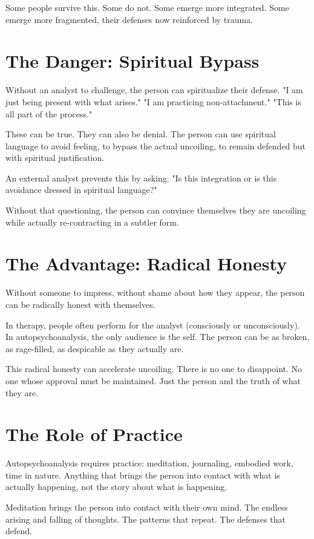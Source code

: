 \documentclass[12pt]{article}
\begin{document}
Some people survive this. Some do not. Some emerge more integrated. Some emerge more fragmented, their defenses now reinforced by trauma.

\section{The Danger: Spiritual Bypass}

Without an analyst to challenge, the person can spiritualize their defense. "I am just being present with what arises." "I am practicing non-attachment." "This is all part of the process."

These can be true. They can also be denial. The person can use spiritual language to avoid feeling, to bypass the actual uncoiling, to remain defended but with spiritual justification.

An external analyst prevents this by asking: "Is this integration or is this avoidance dressed in spiritual language?"

Without that questioning, the person can convince themselves they are uncoiling while actually re-contracting in a subtler form.

\section{The Advantage: Radical Honesty}

Without someone to impress, without shame about how they appear, the person can be radically honest with themselves.

In therapy, people often perform for the analyst (consciously or unconsciously). In autopsychoanalysis, the only audience is the self. The person can be as broken, as rage-filled, as despicable as they actually are.

This radical honesty can accelerate uncoiling. There is no one to disappoint. No one whose approval must be maintained. Just the person and the truth of what they are.

\section{The Role of Practice}

Autopsychoanalysis requires practice: meditation, journaling, embodied work, time in nature. Anything that brings the person into contact with what is actually happening, not the story about what is happening.

Meditation brings the person into contact with their own mind. The endless arising and falling of thoughts. The patterns that repeat. The defenses that defend.
\end{document}
